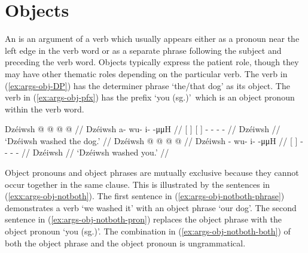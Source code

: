 \section{Objects}\label{sec:args-obj}

An  is an argument of a verb which usually appears either as a pronoun near the left edge in the verb word or as a separate phrase following the subject and preceding the verb word.
Objects typically express the patient role, though they may have other thematic roles depending on the particular verb.
The verb in (\ref{ex:args-obj-DP}) has the determiner phrase  ‘the/that dog’ as its object.
The verb in (\ref{ex:args-obj-pfx}) has the prefix  ‘you (sg.)’\ which is an object pronoun within the verb word.

\pex\label{exx:args-obj}%
\a\label{ex:args-obj-DP}%
%
\begingl
	\gla	{} Dzéiwsh {} {}   {}  @ {} @ {} @ {} @ {} //
	\glb	{} Dzéiwsh {} {}   {} a- wu- i-  -μμH //
	\glc	{}[  {}] {}[   {}]
			- - -  - //
	\gld	{} Dzéiwsh {} {}   {}  {} {} {} {} //
	\glft	‘Dzéiwsh washed the dog.’
		//
\endgl
\a\label{ex:args-obj-pfx}%
%
\begingl
	\gla	{} Dzéiwsh {}  @ {} @ {} @ {} @ {} //
	\glb	{} Dzéiwsh {} - wu- i-  -μμH //
	\glc	{}[  {}] - - -  - //
	\gld	{} Dzéiwsh {}  {} {} {} {} //
	\glft	‘Dzéiwsh washed you.’
		//
\endgl
\xe

Object pronouns and object phrases are mutually exclusive because they cannot occur together in the same clause.
This is illustrated by the sentences in (\ref{exx:args-obj-notboth}).
The first sentence in (\ref{ex:args-obj-notboth-phrase}) demonstrates a verb  ‘we washed it’ with an object phrase  ‘our dog’.
The second sentence in (\ref{ex:args-obj-notboth-pron}) replaces the object phrase with the object pronoun  ‘you (sg.)’.
The combination in (\ref{ex:args-obj-notboth-both}) of both the object phrase and the object pronoun is ungrammatical.

